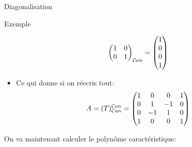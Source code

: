\begin{parag}{Diagonalisation}
\begin{subparag}{Exemple}
\begin{itemize}
\[\begin{pmatrix}
                1 & 0\\0 & 1
            \end{pmatrix}_{\mathcal{C} an} = \begin{pmatrix}
                1 \\0\\0\\1
            \end{pmatrix}\]
            \item Ce qui donne si on réecris tout:
            \[A = (T)_{\mathcal{C} an}^{\mathcal{C} an} = \begin{pmatrix}
                1 & 0 & 0 & 1\\
                0 & 1 & -1 & 0\\
                0 & -1 & 1 & 0\\
                1 & 0 & 0 & 1
            \end{pmatrix}\]
        \end{itemize}
        On va maintenant calculer le polynôme caractéristique:
        \begin{align*}
            

\end{align*}
\end{subparag}
\end{parag}
